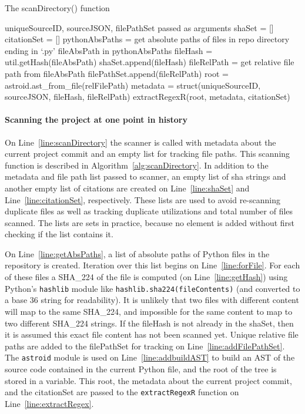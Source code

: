 \begin{algorithm}
  \caption{The scanDirectory() function}\label{alg:scanDirectory}
  \begin{algorithmic}[1]
\State uniqueSourceID, sourceJSON, filePathSet passed as arguments
\State shaSet = []\label{line:shaSet}
\State citationSet = []\label{line:citationSet}
\State pythonAbsPaths = get absolute paths of files in repo directory ending in `.py'\label{line:getAbsPaths}
\For fileAbsPath in pythonAbsPaths\label{line:forFile}
    \State fileHash = util.getHash(fileAbsPath)\label{line:getHash}
        \State shaSet.append(fileHash)
        \State fileRelPath = get relative file path from fileAbsPath
            \State filePathSet.append(fileRelPath)\label{line:addFilePathSet}
        \EndIf
        \State root = astroid.ast\_from\_file(relFilePath)\label{line:buildAST}
        \State metadata = struct(uniqueSourceID, sourceJSON, fileHash, fileRelPath)
        \State extractRegexR(root, metadata, citationSet)\label{line:extractRegex}
    \EndIf
\EndFor
\end{algorithmic}
\end{algorithm}


\paragraph{Scanning the project at one point in history} On Line~\ref{line:scanDirectory} the scanner is called with metadata about the current project commit and an empty list for tracking file paths.  This scanning function is described in Algorithm~\ref{alg:scanDirectory}.  In addition to the metadata and file path list passed to scanner, an empty list of sha strings and another empty list of citations are created on Line~\ref{line:shaSet} and Line~\ref{line:citationSet}, respectively.  These lists are used to avoid re-scanning duplicate files as well as tracking duplicate utilizations and total number of files scanned.  The lists are sets in practice, because no element is added without first checking if the list contains it.

On Line~\ref{line:getAbsPaths}, a list of absolute paths of Python files in the repository is created.  Iteration over this list begins on Line~\ref{line:forFile}.  For each of these files a SHA\_224 of the file is computed (on Line~\ref{line:getHash}) using Python's {\tt hashlib} module like {\tt hashlib.sha224(fileContents)} (and converted to a base 36 string for readability).  It is unlikely that two files with different content will map to the same SHA\_224, and impossible for the same content to map to two different SHA\_224 strings.  If the fileHash is not already in the shaSet, then it is assumed this exact file content has not been scanned yet.  Unique relative file paths are added to the filePathSet for tracking on Line~\ref{line:addFilePathSet}.  The {\tt astroid} module is used on Line~\ref{line:addbuildAST} to build an AST of the source code contained in the current Python file, and the root of the tree is stored in a variable.  This root, the metadata about the current project commit, and the citationSet are passed to the {\tt extractRegexR} function on Line~\ref{line:extractRegex}.

